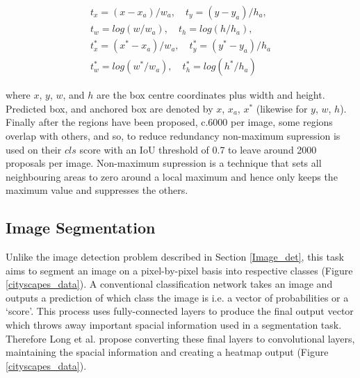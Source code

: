 \documentclass[11pt,twoside]{report}
\begin{document}
\begin{equation}
\begin{aligned}
\label{bounding_box_loss}
t_{x} = (x-x_{a})/w_{a}, \quad t_{y} = (y-y_{a})/h_{a},\\
t_{w} = log(w/w_{a}), \quad t_{h} = log(h/h_{a}), \\
t_{x}^{*} = (x^{*}-x_{a})/w_{a},\quad t_{y}^{*} = (y^{*} - y_{a})/h_{a} \\
t_{w}^{*} = log(w^{*}/w_{a}), \quad t_{h}^{*} = log(h^{*}/h_{a})
\end{aligned}
\end{equation}

where $x$, $y$, $w$, and $h$ are the box centre coordinates plus width and height. Predicted box, and anchored box are denoted by $x$, $x_{a}$, $x^{*}$ (likewise for $y$, $w$, $h$).
\newline \newline
Finally after the regions have been proposed, c.6000 per image, some regions overlap with others, and so, to reduce redundancy non-maximum supression is used on their $cls$ score with an IoU threshold of 0.7 to leave around 2000 proposals per image. Non-maximum supression is a technique that sets all neighbouring areas to zero around a local maximum and hence only keeps the maximum value and suppresses the others.

\subsection{Image Segmentation}\label{image_seg}
Unlike the image detection problem described in Section \ref{Image_det}, this task aims to segment an image on a pixel-by-pixel basis into respective classes (Figure \ref{cityscapes_data}). A conventional classification network takes an image and outputs a prediction of which class the image is i.e. a vector of probabilities or a `score'. This process uses fully-connected layers to produce the final output vector which throws away important spacial information used in a segmentation task. Therefore Long et al. \cite{DBLP:journals/corr/LongSD14} propose converting these final layers to convolutional layers, maintaining the spacial information and creating a heatmap output (Figure \ref{cityscapes_data}).
\end{document}
